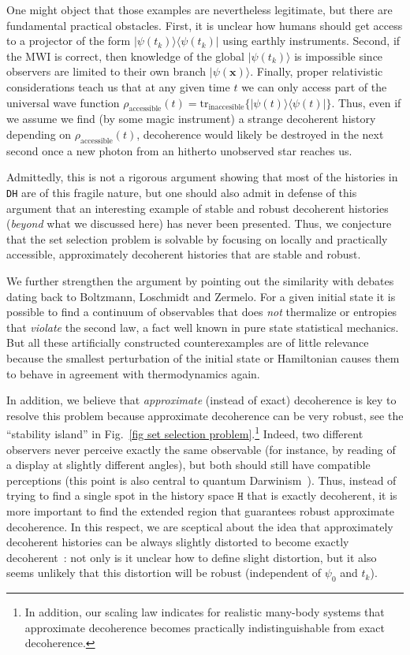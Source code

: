 \documentclass[pre,twocolumn,10pt,aps,longbibliography,nofootinbib]{revtex4-1}
\newcommand{\bb}[1]{\textbf{#1}}
\newcommand{\rl}[0]{{\rangle\langle}}
\newcommand{\blue}[1]{#1}
\begin{document}
One might object that those examples are nevertheless legitimate, but there are fundamental practical obstacles. First, it is unclear how humans should get access to a projector of the form $|\psi(t_k)\rl\psi(t_k)|$ using earthly instruments. Second, \blue{if the MWI is correct, then knowledge of the global $|\psi(t_k)\rangle$ is impossible since observers are limited to their own branch $|\psi(\bb x)\rangle$. Finally,} proper relativistic considerations teach us that at any given time $t$ we can only access part of the universal wave function $\rho_\text{accessible}(t) = \mbox{tr}_\text{inaccesible}\{|\psi(t)\rl\psi(t)|\}$. Thus, even if we assume we find (by some magic instrument) a strange decoherent history depending on $\rho_\text{accessible}(t)$, decoherence would likely be destroyed in the next second once a new photon from an hitherto unobserved star reaches us.

Admittedly, this is not a rigorous argument showing that most of the histories in \texttt{DH} are of this fragile nature, but one should also admit in defense of this argument that an interesting example of stable and robust decoherent histories (\emph{beyond} what we discussed here) has never been presented. Thus, we conjecture that the set selection problem is solvable by focusing on locally and practically accessible, approximately decoherent histories that are stable and robust.

We further strengthen the argument by pointing out the similarity with debates dating back to Boltzmann, Loschmidt and Zermelo. For a given initial state it is possible to find a continuum of observables that does \emph{not} thermalize or entropies that \emph{violate} the second law, a fact well known in pure state statistical mechanics. But all these artificially constructed counterexamples are of little relevance because the smallest perturbation of the initial state or Hamiltonian causes them to behave in agreement with thermodynamics again.

In addition, we believe that \emph{approximate} (instead of exact) decoherence is key to resolve this problem because approximate decoherence can be very robust, see the ``stability island'' in Fig.~\ref{fig set selection problem}.\footnote{In addition, our scaling law indicates for realistic many-body systems that approximate decoherence becomes practically indistinguishable from exact decoherence.} Indeed, two different observers never perceive exactly the same observable (for instance, by reading of a display at slightly different angles), but both should still have compatible perceptions (this point is also central to quantum Darwinism~\cite{ZurekNP2009, KorbiczQuantum2021, ZurekEnt2022}). Thus, instead of trying to find a single spot in the history space $\texttt{H}$ that is exactly decoherent, it is more important to find the extended region that guarantees robust approximate decoherence. In this respect, we are sceptical about the idea that approximately decoherent histories can be always slightly distorted to become exactly decoherent~\cite{DowkerKentPRL1995, DowkerKentJSP1996, HalliwellPRD2001, HalliwellPRA2005}: not only is it unclear how to define slight distortion, but it also seems unlikely that this distortion will be robust (independent of $\psi_0$ and $t_k$).
\end{document}
